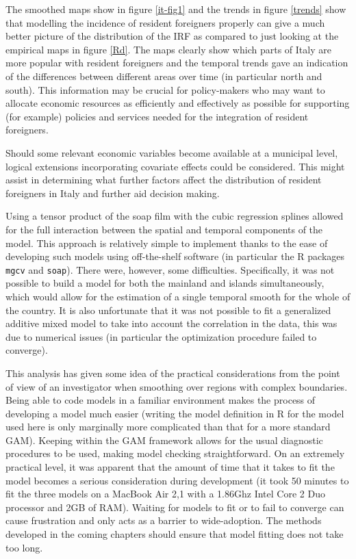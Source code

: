The smoothed maps show in figure \ref{it-fig1} and the trends in figure \ref{trends} show that modelling the incidence of resident foreigners properly can give a much better picture of the distribution of the IRF as compared to just looking at the empirical maps in figure \ref{Rd}. The maps clearly show which parts of Italy are more popular with resident foreigners and the temporal trends gave an indication of the differences between different areas over time (in particular north and south). This information may be crucial for policy-makers who may want to allocate economic resources as efficiently and effectively as possible for supporting (for example) policies and services needed for the integration of resident foreigners.

Should some relevant economic variables become available at a municipal level, logical extensions incorporating covariate effects could be considered. This might assist in determining what further factors \label{cor-r4-1}affect the distribution of resident foreigners in Italy and further aid decision making.

Using a tensor product of the soap film with the cubic regression splines allowed for the full interaction between the spatial and temporal components of the model. This approach is relatively simple to implement thanks to the ease of developing such models using \label{cor-soft1}off-the-shelf software (in particular the \textsf{R} packages \texttt{mgcv} and \texttt{soap}). There were, however, some difficulties. Specifically, it was not possible to build a model for both the mainland and islands simultaneously, which would allow for the estimation of a single temporal smooth for the whole of the country. It is also unfortunate that it was not possible to fit a generalized additive mixed model to take into account the correlation in the data, this was due to numerical issues (in particular the optimization procedure failed to converge).

This analysis has given some idea of the practical considerations from the point of view of an investigator when smoothing over regions with complex boundaries. Being able to code models in a familiar environment makes the process of developing a model much easier (writing the model definition in \textsf{R} for the model used here is only marginally more complicated than that for a more standard GAM). Keeping within the GAM framework allows for the usual diagnostic procedures to be used, making model checking straightforward. On an extremely practical level, it was apparent that the amount of time that it takes to fit the model becomes a serious consideration during development\label{cor-2s2} (it took 50 minutes to fit the three models on a MacBook Air 2,1 with a 1.86Ghz Intel Core 2 Duo processor and 2GB of RAM\label{cor-r28}). Waiting for models to fit or to fail to converge can cause frustration and only acts as a barrier to wide-adoption. The methods developed in the coming chapters should ensure that model fitting does not take too long.\label{cor-2s3}



